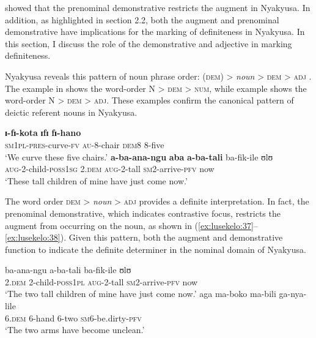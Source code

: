 \documentclass[output=paper]{langscibook}
\begin{document}
\citet{Lusekelo2009} showed that the prenominal demonstrative restricts the augment in Nyakyusa. In addition, as highlighted in section 2.2, both the augment and prenominal demonstrative have implications for the marking of definiteness in Nyakyusa. In this section, I discuss the role of the demonstrative and adjective in marking definiteness. 

Nyakyusa reveals this pattern of noun phrase order: (\textsc{dem}) > \textit{noun} > \textsc{dem} > \textsc{adj} \citep{Lusekelo2009}. The example in  shows the word-order N > \textsc{dem} > \textsc{num}, while example  shows the word-order N > \textsc{dem} > \textsc{adj}. These examples confirm the canonical pattern of deictic referent nouns in Nyakyusa. 

\ea%
    \label{ex:lusekelo:35}
    \textbf{ɪ{}-fɪ{}-kota}    \textbf{ɪfɪ}  \textbf{fɪ{}-hano}\\
  \textsc{sm}1\textsc{pl}-\textsc{pres}-curve-\textsc{fv}  \textsc{au}-8-chair    \textsc{dem}8  8-five    \\
\glt  ‘We curve these five chairs.’
\ex \label{ex:lusekelo:36}
\gll \textbf{a-ba-ana-ngu}  \textbf{aba}  \textbf{a-ba-tali} {ba-fik-ile} {ʊlʊ}\\
  \textsc{aug}-2-child-\textsc{poss}1\textsc{sg}  2.\textsc{dem}  \textsc{aug}-2-tall  \textsc{sm}2-arrive-\textsc{pfv}   now\\
\glt  ‘These tall children of mine have just come now.’
\z

The word order \textsc{dem} > \textit{noun} > \textsc{adj} provides a definite interpretation. In fact, the prenominal demonstrative, which indicates contrastive focus, restricts the augment from occurring on the noun, as shown in (\ref{ex:lusekelo:37}--\ref{ex:lusekelo:38}). Given this pattern, both the augment and demonstrative function to indicate the definite determiner in the nominal domain of Nyakyusa. 

\ea\label{ex:lusekelo:37}
  {ba-ana-ngu}  {a-ba-tali} {ba-fik-ile} {ʊlʊ}\\
  2.\textsc{dem}  2-child-\textsc{poss}1\textsc{pl}  \textsc{aug}-2-tall  \textsc{sm}2-arrive-\textsc{pfv}  now\\
\glt  ‘The two tall children of mine have just come now.’
\ex\label{ex:lusekelo:38}
\gll  aga {ma-boko}    ma-bili {ga-nya-lile}\\
  6.\textsc{dem}  6-hand    6-two    \textsc{sm}6-be.dirty-\textsc{pfv}\\
\glt  ‘The two arms have become unclean.’
\z
\end{document}
